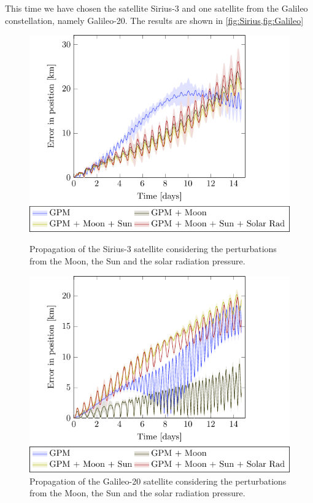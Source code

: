 \documentclass[../main.tex]{subfiles}
\begin{document}
This time we have chosen the satellite Sirius-3 and one satellite from the Galileo constellation, namely Galileo-20. The results are shown in \cref{fig:Sirius,fig:Galileo}
\begin{figure}[ht]
  \centering
  \begin{minipage}[ht]{0.45\textwidth}
    \centering
    \includegraphics[width=\textwidth]{Images/simulation/SIRIUS.pdf}
    \caption{Propagation of the Sirius-3 satellite considering the perturbations from the Moon, the Sun and the solar radiation pressure.}
    \label{fig:Sirius}
  \end{minipage}
  \hspace{0.0333333\textwidth}
  \begin{minipage}[ht]{0.45\textwidth}
    \centering
    \includegraphics[width=\textwidth]{Images/simulation/GALILEO.pdf}
    \caption{Propagation of the Galileo-20 satellite considering the perturbations from the Moon, the Sun and the solar radiation pressure.}
    \label{fig:Galileo}
  \end{minipage}
\end{figure}
\end{document}
